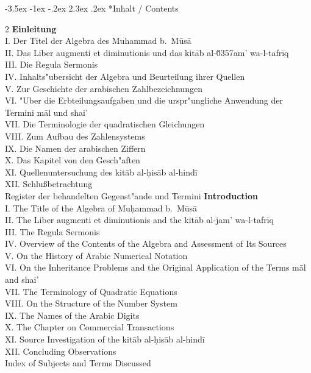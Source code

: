 \documentclass[10pt,a4paper]{article}
\makeatletter
\renewcommand{\switchcolumn}{\syncronize\nointerlineskip\columnbreak}
\renewcommand{\section}{\@startsection{section}{1}{\z@}%
  {-3.5ex \@plus -1ex \@minus -.2ex}%
  {2.3ex \@plus .2ex}%
  {\normalfont\Large\bfseries\color{sectioncolor}}}
\makeatother
\begin{document}
\section*{Inhalt / Contents}

\begin{paracol}{2}
\textbf{Einleitung}\\
I. Der Titel der Algebra des Muhammad b.\ M\=us\=a\\
II. Das Liber augmenti et diminutionis und das kit\=ab al-\u0357{}am' wa-l-tafr\={i}q\\
III. Die Regula Sermonis\\
IV. Inhalts"ubersicht der Algebra und Beurteilung ihrer Quellen\\
V. Zur Geschichte der arabischen Zahlbezeichnungen\\
VI. "Uber die Erbteilungsaufgaben und die urspr"ungliche Anwendung der Termini m\=al und shai'\\
VII. Die Terminologie der quadratischen Gleichungen\\
VIII. Zum Aufbau des Zahlensystems\\
IX. Die Namen der arabischen Ziffern\\
X. Das Kapitel von den Gesch"aften\\
XI. Quellenuntersuchung des kit\=ab al-\d{h}is\=ab al-hind\=i\\
XII. Schlu\ss{}betrachtung\\
Register der behandelten Gegenst"ande und Termini
\switchcolumn
\textbf{Introduction}\\
I. The Title of the Algebra of Mu\d{h}ammad b.\ M\=us\=a\\
II. The Liber augmenti et diminutionis and the kit\=ab al-jam' wa-l-tafr\={i}q\\
III. The Regula Sermonis\\
IV. Overview of the Contents of the Algebra and Assessment of Its Sources\\
V. On the History of Arabic Numerical Notation\\
VI. On the Inheritance Problems and the Original Application of the Terms m\=al and shai'\\
VII. The Terminology of Quadratic Equations\\
VIII. On the Structure of the Number System\\
IX. The Names of the Arabic Digits\\
X. The Chapter on Commercial Transactions\\
XI. Source Investigation of the kit\=ab al-\d{h}is\=ab al-hind\=i\\
XII. Concluding Observations\\
Index of Subjects and Terms Discussed
\end{paracol}
\clearpage
\end{document}
